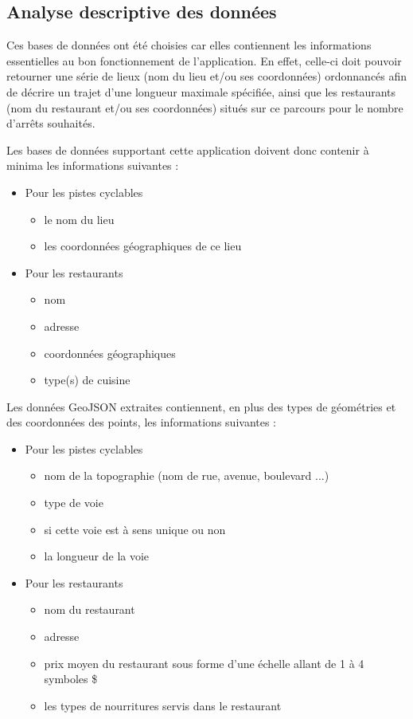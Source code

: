 \documentclass[12pt]{article}
\begin{document}
\subsection{Analyse descriptive des données}

    Ces bases de données ont été choisies car elles contiennent les informations essentielles au bon fonctionnement de l'application. En effet, celle-ci doit pouvoir retourner une série de lieux (nom du lieu et/ou ses coordonnées) ordonnancés afin de décrire un trajet d'une longueur maximale spécifiée, ainsi que les restaurants (nom du restaurant et/ou ses coordonnées) situés  sur ce parcours pour le nombre d'arrêts souhaités. 
    
    Les bases de données supportant cette application doivent donc contenir à minima les informations suivantes :

    \begin{itemize}
        \item Pour les pistes cyclables
        \begin{itemize}
            \item le nom du lieu
            \item les coordonnées géographiques de ce lieu
        \end{itemize}
        \item Pour les restaurants
        \begin{itemize}
            \item nom
            \item adresse
            \item coordonnées géographiques
            \item type(s) de cuisine
        \end{itemize}
    \end{itemize}

    Les données GeoJSON extraites contiennent, en plus des types de géométries et des coordonnées des points, les informations suivantes :
     \begin{itemize}
         \item Pour les pistes cyclables
         \begin{itemize}
             \item nom de la topographie (nom de rue, avenue, boulevard ...)
             \item type de voie
             \item si cette voie est à sens unique ou non
             \item la longueur de la voie
         \end{itemize}
         \item Pour les restaurants
         \begin{itemize}
             \item nom du restaurant
             \item adresse
             \item prix moyen du restaurant sous forme d'une échelle allant de 1 à 4 symboles \$
             \item les types de nourritures servis dans le restaurant
         \end{itemize}
     \end{itemize}
\end{document}
